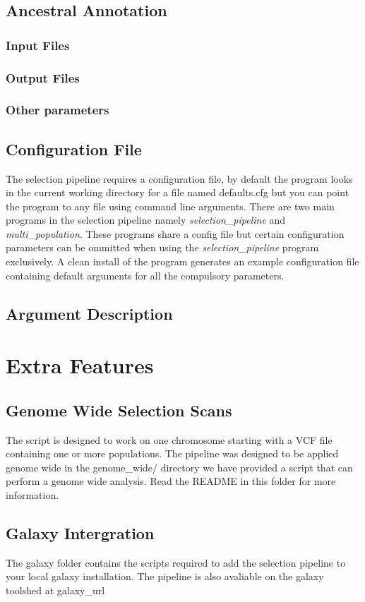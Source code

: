 \documentclass[a4paper,10pt]{article}
\begin{document}
\subsection{Ancestral Annotation}
\subsubsection{Input Files}
\subsubsection{Output Files}
\subsubsection{Other parameters}

\subsection{Configuration File}
The selection pipeline requires a configuration file, by default the program looks in the current working directory for a file named defaults.cfg but you can point the program to any file using command line arguments. There are two main programs in the selection pipeline namely \emph{selection\_pipeline} and \emph{multi\_population}. These programs share a config file but certain configuration parameters can be ommitted when using the \emph{selection\_pipeline} program exclusively. A clean install of the program generates an example configuration file containing default arguments for all the compulsory parameters.
\subsection{Argument Description}


\section{Extra Features}

\subsection{Genome Wide Selection Scans}
The script is designed to work on one chromosome starting with a VCF file containing one or more populations. The pipeline was designed to be applied genome wide in the genome\_wide/ directory we have provided a script that can perform a genome wide analysis. Read the README in this folder for more information.
\subsection{Galaxy Intergration}
The galaxy folder contains the scripts required to add the selection pipeline to your local galaxy installation. The pipeline is also avaliable on the galaxy toolshed at galaxy\_url




\end{document}
